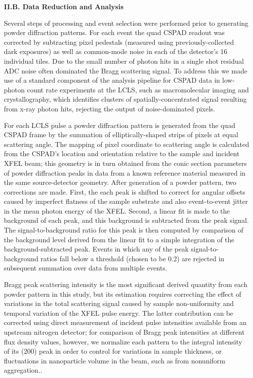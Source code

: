\textbf{II.B. Data Reduction and Analysis}

Several steps of processing and event selection were performed prior to
generating powder diffraction patterns. For each event the quad CSPAD
readout was corrected by subtracting pixel pedestals (measured using
previously-collected dark exposures) as well as common-mode noise in
each of the detector's 16 individual tiles. \cite{hart2012cspad} Due to the small
number of photon hits in a single shot residual ADC noise often
dominated the Bragg scattering signal. To address this we made use of a
standard component of the analysis pipeline for CSPAD data in low-photon
count rate experiments at the LCLS, such as macromolecular imaging and
crystallography, which identifies clusters of spatially-concentrated
signal resulting from x-ray photon hits, rejecting the output of
noise-dominated pixels. \cite{damiani2016linac}

For each LCLS pulse a powder diffraction pattern is generated from the
quad CSPAD frame by the summation of elliptically-shaped strips of
pixels at equal scattering angle. The mapping of pixel coordinate to
scattering angle is calculated from the CSPAD's location and orientation
relative to the sample and incident XFEL beam; this geometry is in turn
obtained from the conic section parameters of powder diffraction peaks
in data from a known reference material measured in the same
source-detector geometry. After generation of a powder pattern, two
corrections are made. First, the each peak is shifted to correct for
angular offsets caused by imperfect flatness of the sample substrate and
also event-to-event jitter in the mean photon energy of the XFEL.
Second, a linear fit is made to the background of each peak, and this
background is subtracted from the peak signal. The signal-to-background
ratio for this peak is then computed by comparison of the background
level derived from the linear fit to a simple integration of the
background-subtracted peak. Events in which any of the peak
signal-to-background ratios fall below a threshold (chosen to be 0.2)
are rejected in subsequent summation over data from multiple events.

Bragg peak scattering intensity is the most significant derived quantity
from each powder pattern in this study, but its estimation requires
correcting the effect of variations in the total scattering signal
caused by sample non-uniformity and temporal variation of the XFEL pulse
energy. The latter contribution can be corrected using direct
measurement of incident pulse intensities available from an upstream
nitrogen detector; for comparison of Bragg peak intensities at different
flux density values, however, we normalize each pattern to the integral
intensity of its (200) peak in order to control for variations in sample
thickness, or fluctuations in nanoparticle volume in the beam, such as
from nonuniform aggregation..

